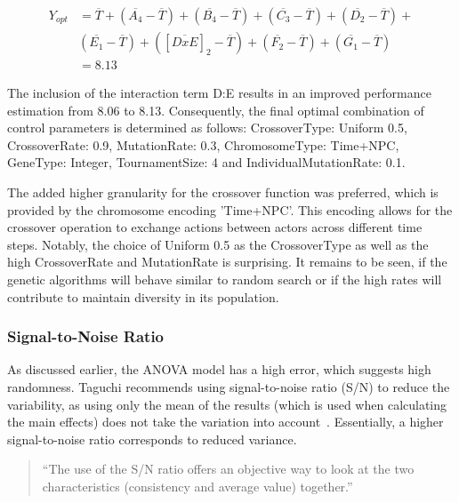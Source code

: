 \begin{equation}
	\begin{split}
		Y_{opt} &= \overline{T} + (\overline{A_4} - \overline{T}) + (\overline{B_4} - \overline{T}) + (\overline{C_3} - \overline{T}) + (\overline{D_2} - \overline{T}) + \\& (\overline{E_1} - \overline{T})  + ([\overline{DxE}]_2 - \overline{T})  + (\overline{F_2} - \overline{T}) + (\overline{G_1} - \overline{T}) \\
		&= 8.13
	\end{split}
	 \label{equ:hyperparameter_tuning:optimum_perf_included_interaction}
\end{equation}

The inclusion of the interaction term D:E results in an improved performance estimation from 8.06 to 8.13. Consequently, the final optimal combination of control parameters is determined as follows: CrossoverType: Uniform 0.5, CrossoverRate: 0.9, MutationRate: 0.3, ChromosomeType: Time+NPC, GeneType: Integer, TournamentSize: 4 and IndividualMutationRate: 0.1.

The added higher granularity for the crossover function was preferred, which is provided by the chromosome encoding 'Time+NPC'. This encoding allows for the crossover operation to exchange actions between actors across different time steps. Notably, the choice of Uniform 0.5 as the CrossoverType as well as the high CrossoverRate and MutationRate is surprising. It remains to be seen, if the genetic algorithms will behave similar to random search or if the high rates will contribute to maintain diversity in its population.

\subsubsection{Signal-to-Noise Ratio}
As discussed earlier, the ANOVA model has a high error, which suggests high randomness. Taguchi recommends using signal-to-noise ratio (S/N) to reduce the variability, as using only the mean of the results (which is used when calculating the main effects) does not take the variation into account~\cite{roy_primer_1990}. Essentially, a higher signal-to-noise ratio corresponds to reduced variance.

\begin{quote}
	\begin{em}
		\enquote{The use of the S/N ratio offers an objective way to look at the two characteristics (consistency and average value) together.}~\cite{roy_primer_1990}
	\end{em}
\end{quote}

